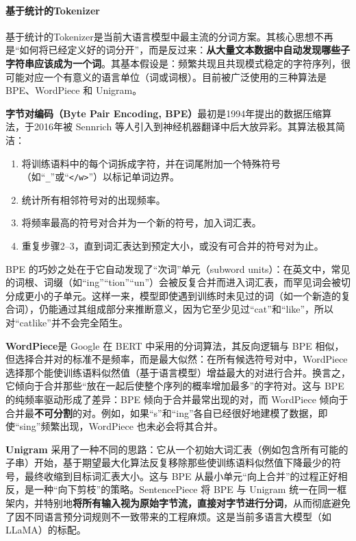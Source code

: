 \paragraph{基于统计的Tokenizer} 基于统计的Tokenizer是当前大语言模型中最主流的分词方案。其核心思想不再是“如何将已经定义好的词分开”，而是反过来：\textbf{从大量文本数据中自动发现哪些子字符串应该成为一个词}。其基本假设是：频繁共现且共现模式稳定的字符序列，很可能对应一个有意义的语言单位（词或词根）。目前被广泛使用的三种算法是 BPE、WordPiece 和 Unigram。

\textbf{字节对编码（Byte Pair Encoding, BPE）}最初是1994年提出的数据压缩算法\cite{gage1994new}，于2016年被 Sennrich 等人\cite{sennrich2016neuralmachinetranslationrare}引入到神经机器翻译中后大放异彩。其算法极其简洁：
\begin{enumerate}
    \item 将训练语料中的每个词拆成字符，并在词尾附加一个特殊符号（如“\verb|_|”或“\verb|</w>|”）以标记单词边界。
    \item 统计所有相邻符号对的出现频率。
    \item 将频率最高的符号对合并为一个新的符号，加入词汇表。
    \item 重复步骤2--3，直到词汇表达到预定大小，或没有可合并的符号对为止。
\end{enumerate}
BPE 的巧妙之处在于它自动发现了“次词”单元（subword units）：在英文中，常见的词根、词缀（如“ing”“tion”“un”）会被反复合并而进入词汇表，而罕见词会被切分成更小的子单元。这样一来，模型即使遇到训练时未见过的词（如一个新造的复合词），仍能通过其组成部分来推断意义，因为它至少见过“cat”和“like”，所以对“catlike”并不会完全陌生。

\textbf{WordPiece}\cite{6289079}是 Google 在 BERT 中采用的分词算法，其反向逻辑与 BPE 相似，但选择合并对的标准不是频率，而是最大似然：在所有候选符号对中，WordPiece 选择那个能使训练语料似然值（基于语言模型）增益最大的对进行合并。换言之，它倾向于合并那些“放在一起后使整个序列的概率增加最多”的字符对。这与 BPE 的纯频率驱动形成了差异：BPE 倾向于合并最常出现的对，而 WordPiece 倾向于合并最\textbf{不可分割}的对。例如，如果“s”和“ing”各自已经很好地建模了数据，即使“sing”频繁出现，WordPiece 也未必会将其合并。

\textbf{Unigram} 采用了一种不同的思路：它从一个初始大词汇表（例如包含所有可能的子串）开始，基于期望最大化算法反复移除那些使训练语料似然值下降最少的符号，最终收缩到目标词汇表大小。这与 BPE 从最小单元“向上合并”的过程正好相反，是一种“向下剪枝”的策略。SentencePiece\cite{kudo2018sentencepiecesimplelanguageindependent} 将 BPE 与 Unigram 统一在同一框架内，并特别地\textbf{将所有输入视为原始字节流，直接对字节进行分词}，从而彻底避免了因不同语言预分词规则不一致带来的工程麻烦。这是当前多语言大模型（如 LLaMA）的标配。

